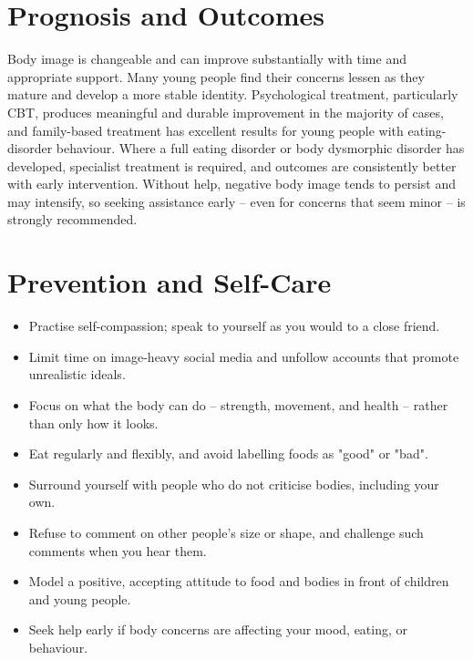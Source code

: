 \section*{Prognosis and Outcomes}
Body image is changeable and can improve substantially with time and appropriate support. Many young people find their concerns lessen as they mature and develop a more stable identity. Psychological treatment, particularly CBT, produces meaningful and durable improvement in the majority of cases, and family-based treatment has excellent results for young people with eating-disorder behaviour. Where a full eating disorder or body dysmorphic disorder has developed, specialist treatment is required, and outcomes are consistently better with early intervention. Without help, negative body image tends to persist and may intensify, so seeking assistance early -- even for concerns that seem minor -- is strongly recommended.

\section*{Prevention and Self-Care}
\begin{itemize}
    \item Practise self-compassion; speak to yourself as you would to a close friend.
    \item Limit time on image-heavy social media and unfollow accounts that promote unrealistic ideals.
    \item Focus on what the body can do -- strength, movement, and health -- rather than only how it looks.
    \item Eat regularly and flexibly, and avoid labelling foods as "good" or "bad".
    \item Surround yourself with people who do not criticise bodies, including your own.
    \item Refuse to comment on other people's size or shape, and challenge such comments when you hear them.
    \item Model a positive, accepting attitude to food and bodies in front of children and young people.
    \item Seek help early if body concerns are affecting your mood, eating, or behaviour.
\end{itemize}


